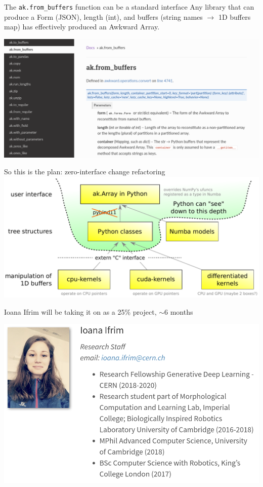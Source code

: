 \documentclass[aspectratio=169]{beamer}
\begin{document}
\begin{frame}{The \texttt{ak.from_buffers} function can be a standard interface}
\large
\vspace{0.2 cm}
Any library that can produce a Form (JSON), length (int), and buffers (string names $\to$ 1D buffers map) has effectively produced an Awkward Array.

\vspace{0.2 cm}
\includegraphics[width=\linewidth]{from_buffers.png}
\end{frame}

\begin{frame}{So this is the plan: zero-interface change refactoring}
\vspace{0.5 cm}
\includegraphics[width=\linewidth]{awkward-1-0-layers-1.pdf}
\end{frame}

\begin{frame}{Ioana Ifrim will be taking it on as a 25\% project, $\sim$6 months}
\vspace{0.4 cm}
\begin{center}
\includegraphics[width=0.8\linewidth]{ioana.png}
\end{center}
\end{frame}
\end{document}
